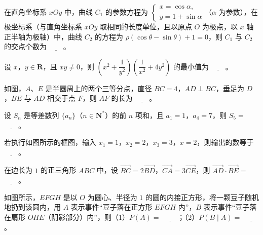 \begin{question}
在直角坐标系 $xOy$ 中，曲线 $C_1$ 的参数方程为 $\begin{cases}x=\cos\alpha,\\y=1+\sin\alpha\end{cases}$（$\alpha$ 为参数），在极坐标系（与直角坐标系 $xOy$ 取相同的长度单位，且以原点 $O$ 为极点，以 $x$ 轴正半轴为极轴）中，曲线 $C_2$ 的方程为 $\rho(\cos\theta-\sin\theta)+1=0$，则 $C_1$ 与 $C_2$ 的交点个数为 $\underline{\qquad}$。

\end{question}
\begin{question}
设 $x$，$y\in\mathbf R$，且 $xy\neq0$，则 $\left(x^2+\dfrac1{y^2}\right)\left(\dfrac1{x^2}+4y^2\right)$ 的最小值为 $\underline{\qquad}$。

\Needspace{0.4\textheight}
\end{question}
\begin{question}
如图，$A$、$E$ 是半圆周上的两个三等分点，直径 $BC=4$，$AD\perp BC$，垂足为 $D$，$BE$ 与 $AD$ 相交于点 $F$，则 $AF$ 的长为 $\underline{\qquad}$。
\nopagebreak[4]
\begin{center}\end{center}
\nopagebreak[4]
\end{question}
\begin{question}
设 $S_n$ 是等差数列 $\{a_n\}$（$n\in\mathbf N^*$）的前 $n$ 项和，且 $a_1=1$，$a_4=7$，则 $S_5=$ $\underline{\qquad}$。

\Needspace{0.4\textheight}
\end{question}
\begin{question}
若执行如图所示的框图，输入 $x_1=1$，$x_2=2$，$x_3=3$，$x=2$，则输出的数等于 $\underline{\qquad}$。
\nopagebreak[4]
\begin{center}\end{center}
\nopagebreak[4]
\end{question}
\begin{question}
在边长为 $1$ 的正三角形 $ABC$ 中，设 $\overrightarrow{BC}=2\overrightarrow{BD}$，$\overrightarrow{CA}=3\overrightarrow{CE}$，则 $\overrightarrow{AD}\cdot\overrightarrow{BE}=$ $\underline{\qquad}$。

\Needspace{0.4\textheight}
\end{question}
\begin{question}
如图所示，$EFGH$ 是以 $O$ 为圆心、半径为 $1$ 的圆的内接正方形，将一颗豆子随机地扔到该圆内，用 $A$ 表示事件“豆子落在正方形 $EFGH$ 内”，$B$ 表示事件“豆子落在扇形 $OHE$（阴影部分）内”，则（1）$P(A)=$ $\underline{\qquad}$；（2）$P(B\mid A)=$ $\underline{\qquad}$。
\nopagebreak[4]
\begin{center}\end{center}
\nopagebreak[4]
\end{question}
